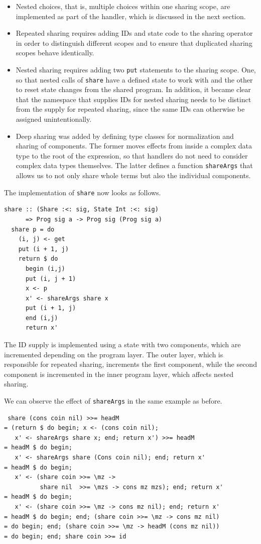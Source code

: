 \documentclass[a4paper, 11pt, fleqn, twoside, abstract=on]{scrreprt}
\newcommand{\hinl}[1]{\texttt{#1}}
\begin{document}
\begin{itemize}
\item Nested choices, that is, multiple choices within one sharing scope, are implemented as part of the handler, which is discussed in the next section.
\item Repeated sharing requires adding IDs and state code to the sharing operator in order to distinguish different scopes and to ensure that duplicated sharing scopes behave identically.
\item Nested sharing requires adding two \hinl{put} statements to the sharing scope.
      One, so that nested calls of \hinl{share} have a defined state to work with and the other to reset state changes from the shared program.
      In addition, it became clear that the namespace that supplies IDs for nested sharing needs to be distinct from the supply for repeated sharing, since the same IDs can otherwise be assigned unintentionally.
\item Deep sharing was added by defining type classes for normalization and sharing of components.
      The former moves effects from inside a complex data type to the root of the expression, so that handlers do not need to consider complex data types themselves.
      The latter defines a function \hinl{shareArgs} that allows us to not only share whole terms but also the individual components.
\end{itemize}
\noindent
The implementation of \hinl{share} now looks as follows.

\begin{verbatim}
share :: (Share :<: sig, State Int :<: sig) 
      => Prog sig a -> Prog sig (Prog sig a)
  share p = do
    (i, j) <- get
    put (i + 1, j)
    return $ do
      begin (i,j)
      put (i, j + 1)
      x <- p
      x' <- shareArgs share x
      put (i + 1, j)
      end (i,j)
      return x'
\end{verbatim}
\noindent
The ID supply is implemented using a state with two components, which are incremented depending on the program layer.
The outer layer, which is responsible for repeated sharing, increments the first component, while the second component is incremented in the inner program layer, which affects nested sharing.

We can observe the effect of \hinl{shareArgs} in the same example as before.

\begin{verbatim}
 share (cons coin nil) >>= headM
= (return $ do begin; x <- (cons coin nil); 
   x' <- shareArgs share x; end; return x') >>= headM
= headM $ do begin; 
   x' <- shareArgs share (Cons coin nil); end; return x'
= headM $ do begin; 
   x' <- (share coin >>= \mz -> 
          share nil  >>= \mzs -> cons mz mzs); end; return x'
= headM $ do begin; 
   x' <- (share coin >>= \mz -> cons mz nil); end; return x'
= headM $ do begin; end; (share coin >>= \mz -> cons mz nil)
= do begin; end; (share coin >>= \mz -> headM (cons mz nil))
= do begin; end; share coin >>= id
\end{verbatim}
\end{document}
